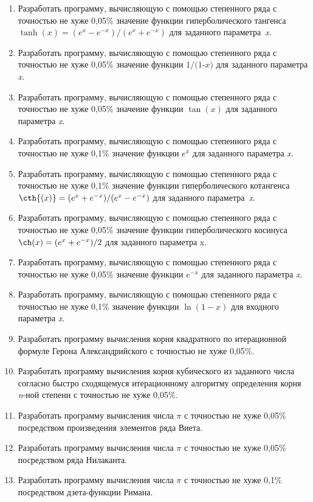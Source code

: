 \begin{enumerate}
	\item Разработать программу, вычисляющую с помощью степенного ряда с точностью не хуже 0,05\% значение функции гиперболического тангенса $\tanh(x)=(e^x-e^{-x})/(e^x+e^{-x})$ для  заданного параметра~\textit{x}.
	\item Разработать программу, вычисляющую с помощью степенного ряда с точностью не хуже 0,05\% значение функции $\textit{1/(1-x)}$ для  заданного параметра \textit{x}.
	\item Разработать программу, вычисляющую с помощью степенного ряда с точностью не хуже 0,05\% значение функции $\tan(x)$ для  заданного параметра \textit{x}.
	\item Разработать программу, вычисляющую с помощью степенного ряда с точностью не хуже 0,1\%  значение функции $e^x$ для  заданного параметра \textit{x}.
    \item Разработать программу, вычисляющую с помощью степенного ряда с точностью не хуже 0,1\% значение функции гиперболического котангенса $\cth{(x)}=(e^x+e^{-x})/(e^x-e^{-x})$ для  заданного параметра~\textit{x}.
    \item Разработать программу, вычисляющую с помощью степенного ряда с точностью не хуже 0,05\% значение функции гиперболического косинуса $\ch(x)=(e^x+e^{-x})/2$ для  заданного параметра x.
    \item Разработать программу, вычисляющую с помощью степенного ряда с точностью не хуже 0,05\% значение функции $e^{-x}$ для  заданного параметра \textit{x}.
	\item Разработать программу, вычисляющую с помощью степенного ряда с точностью не хуже 0,1\% значение функции $\ln{(1-x)}$ для  входного параметра \textit{x}.
    \item Разработать программу вычисления корня квадратного по итерационной формуле Герона Александрийского с точностью не хуже 0,05\%.
	\item Разработать программу вычисления корня кубического из заданного числа согласно быстро сходящемуся итерационному алгоритму определения корня \textit{n}-ной степени с точностью не хуже 0,05\%.
    \item Разработать программу вычисления числа $\pi$ с точностью не хуже 0,05\% посредством произведения элементов ряда Виета.
    \item Разработать программу вычисления числа $\pi$ с точностью не хуже 0,05\% посредством ряда Нилаканта.
    \item Разработать программу вычисления числа $\pi$ с точностью не хуже 0,1\% посредством дзета-функции Римана.

\end{enumerate}
